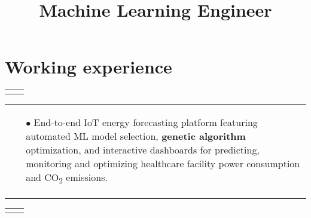 \documentclass[11pt,a4paper,sans,english]{moderncv}
\title{Machine Learning Engineer}
\makeatletter
\renewcommand*{\cventry}[6][.25em]{%
	\vspace{1.5mm}%
	\begin{tabular*}{\textwidth}{@{\extracolsep{\fill}}ll}%
		\ifthenelse{\equal{#3}{}}{}{\textbf{#3}} &
		\ifthenelse{\equal{#2}{}}{}{#4 #6 #2}\\%
	\end{tabular*}%
	\par\addvspace{#1}}
\newcommand*{\mycvitem}[2][.25em]{%
	\vspace{-.25em}%
	\begin{tabular}{@{}p{\textwidth}@{}}%
		\small#2%
	\end{tabular}%
	\par\addvspace{-0.7em}}
\newcommand*{\cvtag}[1]{%
	\textcolor{lightgray!50!black}{\fbox{\mathstrut\scriptsize\textsf{\textbf{#1}}}}}
\makeatother
\begin{document}
	
	\newcommand{\jobdouble}[9]{%
		\cvdoubleitem{#3}{#1, #2, #4}{#7}{#5, #6, #8}
	}
	
	\makecvtitle
	\vspace*{-1cm} %
	
	\section{Working experience}
	\vspace*{-.15cm}
	\cventry{\scalebox{0.9}{\faCalendar\ 01/2025-- current}}{Machine Learning Engineer - Senior Consultant}{\scalebox{0.9}{\faBuilding\ \href{https://www.linksmt.it/}{\textit{Links Management \& Technology}}}}{}{\scalebox{0.9}{\faMapMarker\ Bari}}{}
	\mycvitem{%
		\vspace*{-.6cm}
		\begin{flushleft}
			\noindent
			\cvtag{Python} \cvtag{Java} \cvtag{Docker} \cvtag{Gitlab CI/CD} \cvtag{LangChain} \cvtag{AWS: EC2, S3, Lambda, SageMaker, Transcribe, Polly, SQS, SNS, RDS, EventBridge} \cvtag{PyTorch} \cvtag{TensorFlow} \cvtag{Keras} \cvtag{Milvus} \cvtag{FastAPI} \cvtag{Spring Boot} \cvtag{Git} \cvtag{PostgreSQL} \cvtag{MongoDB} \cvtag{Redis} \cvtag{Snowflake}
			\cvtag{Keycloak} \cvtag{Mosquitto}
		\end{flushleft}
		\vspace*{-.2cm}
		\begin{itemize}
			\item[$\bullet$] End-to-end IoT energy forecasting platform featuring automated ML model selection, \textbf{genetic algorithm} optimization, and interactive dashboards for predicting, monitoring and optimizing healthcare facility power consumption and CO\textsubscript{2} emissions.
		\end{itemize}
	}
	\vspace*{.25cm}
	\cventry{\scalebox{0.9}{\faCalendar\ 03/2023--12/2024}}{Machine Learning Engineer - Consultant}{\scalebox{0.9}{\faBuilding\ \href{https://www.linksmt.it/}{\textit{Links Management \& Technology}}}}{}{\scalebox{0.9}{\faMapMarker\ Bari}}{}
\end{document}
